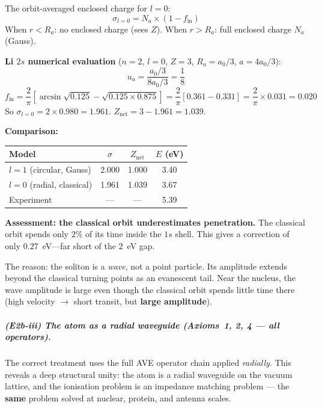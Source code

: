 The orbit-averaged enclosed charge for $l = 0$:
\begin{equation}
    \sigma_{l=0} = N_a \times (1 - f_{\text{in}})
    \label{eq:sigma_l0}
\end{equation}
When $r < R_a$: no enclosed charge (sees $Z$).
When $r > R_a$: full enclosed charge $N_a$ (Gauss).

\noindent\textbf{Li $2s$ numerical evaluation}
($n=2$, $l=0$, $Z=3$, $R_a = a_0/3$,
$a = 4a_0/3$):
\begin{equation}
    u_a = \frac{a_0/3}{8a_0/3} = \frac{1}{8}
\end{equation}
\begin{equation}
    f_{\text{in}} = \frac{2}{\pi}
    \left[\arcsin\!\sqrt{0.125}
    - \sqrt{0.125 \times 0.875}\right]
    = \frac{2}{\pi}[0.361 - 0.331]
    = \frac{2}{\pi} \times 0.031 = 0.020
\end{equation}
So $\sigma_{l=0} = 2 \times 0.980 = 1.961$.
$Z_{\text{net}} = 3 - 1.961 = 1.039$.

\noindent\textbf{Comparison:}
\begin{center}
\small
\begin{tabular}{lccc}
\hline
\textbf{Model} & $\sigma$ & $Z_{\text{net}}$ & $E$ (eV) \\
\hline
$l = 1$ (circular, Gauss) & 2.000 & 1.000 & 3.40 \\
$l = 0$ (radial, classical) & 1.961 & 1.039 & 3.67 \\
Experiment & --- & --- & 5.39 \\
\hline
\end{tabular}
\end{center}

\noindent\textbf{Assessment: the classical orbit
underestimates penetration.}
The classical orbit spends only $2\%$ of its time
inside the $1s$ shell.  This gives a correction of
only $0.27$~eV---far short of the $2$~eV gap.

The reason: the soliton is a \emph{wave}, not a
point particle.  Its amplitude extends beyond the
classical turning points as an evanescent tail.
Near the nucleus, the wave amplitude is large even
though the classical orbit spends little time there
(high velocity $\to$ short transit, but
\textbf{large amplitude}).

\subparagraph{(E2b-iii) The atom as a radial waveguide
(Axioms~1, 2, 4 --- all operators).}

The correct treatment uses the full AVE operator
chain applied \emph{radially}.  This reveals a
deep structural unity: the atom is a radial waveguide
on the vacuum lattice, and the ionisation problem is
an impedance matching problem --- the \textbf{same}
problem solved at nuclear, protein, and antenna scales.

